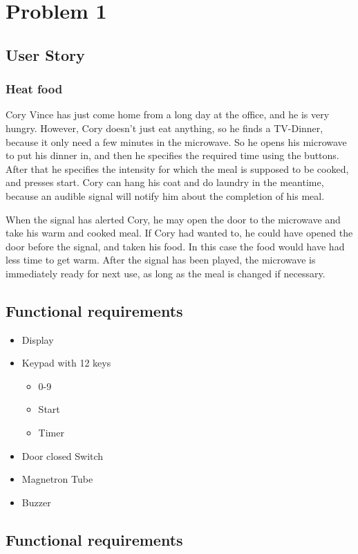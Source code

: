 \chapter{Problem 1}
\label{chp:intro}
\section{User Story}
\subsection{Heat food}
Cory Vince has just come home from a long day at the office, and he is very hungry. However, Cory doesn’t just eat anything, so he finds a TV-Dinner, because it only need a few minutes in the microwave. So he opens his microwave to put his dinner in, and then he specifies the required time using the buttons. After that he specifies the intensity for which the meal is supposed to be cooked, and presses start. Cory can hang his coat and do laundry in the meantime, because an audible signal will notify him about the completion of his meal.

When the signal has alerted Cory, he may open the door to the microwave and take his warm and cooked meal. If Cory had wanted to, he could have opened the door before the signal, and taken his food. In this case the food would have had less time to get warm. After the signal has been played, the microwave is immediately ready for next use, as long as the meal is changed if necessary.

\section{Functional requirements}

\begin{itemize}
	\item Display
	\item Keypad with 12 keys
	\begin{itemize}
		\item 0-9
		\item Start
		\item Timer
	\end{itemize}
	\item Door closed Switch
	\item Magnetron Tube
	\item Buzzer
\end{itemize}

\section{Functional requirements}
